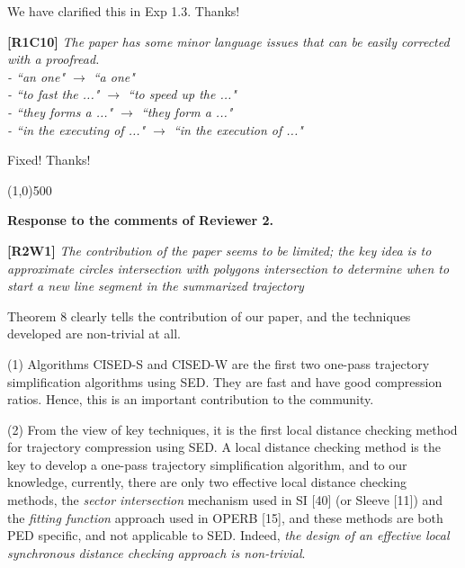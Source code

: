 \documentclass{letter}
\begin{document}
{We have clarified this in Exp 1.3. Thanks!




\textbf{[R1C10]} \emph{The paper has some minor language issues that can be easily corrected with a proofread.\\
- ``an one" $\rightarrow$ ``a one" \\
- ``to fast the ..." $\rightarrow$ ``to speed up the ..." \\
- ``they forms a ..." $\rightarrow$ ``they form a ..."	\\
- ``in the executing of ..." $\rightarrow$ ``in the execution of ..."
}


Fixed! Thanks!

\line(1,0){500}

\textbf{Response to the comments of Reviewer 2.}

\textbf{[R2W1]} \emph{The contribution of the paper seems to be limited; the key idea is to approximate circles intersection with polygons intersection to determine when to start a new line segment in the summarized trajectory}

Theorem 8 clearly tells the contribution of our paper, and the techniques developed are non-trivial at all.

(1) Algorithms CISED-S and CISED-W are the first two one-pass trajectory simplification algorithms using SED. They are fast and have good compression ratios.
Hence, this is an important contribution to the community.

(2) From the view of key techniques, it is the first local distance checking method for trajectory compression using SED. A local distance checking method is the key to develop a one-pass trajectory simplification algorithm, and to our knowledge, currently, there are only two effective local distance checking methods, the \textit{sector intersection} mechanism used in SI [40] (or Sleeve [11]) and the \textit{fitting function} approach used in OPERB [15], and these methods are both PED specific, and not applicable to SED. Indeed, {\em the design of an effective local synchronous distance checking approach is non-trivial}.}
\end{document}
